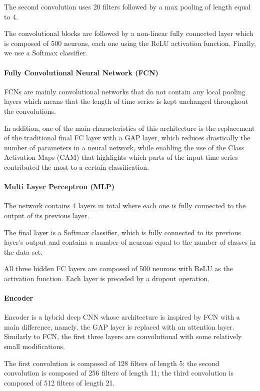 \documentclass[conference]{IEEEtran}
\begin{document}
The second convolution uses 20 filters followed by a max pooling of length equal to 4. 

The convolutional blocks are followed by a non-linear fully connected layer which is composed of 500 neurons, each one using the ReLU activation function. Finally, we use a Softmax classifier.

\paragraph{Fully Convolutional Neural Network (FCN)}
FCNs are mainly convolutional networks \cite{Wang2017} that do not contain any local pooling layers which means that the length of time series is kept unchanged throughout the convolutions. 

In addition, one of the main characteristics of this architecture is the replacement of the traditional final FC layer with a GAP layer, which reduces drastically the number of parameters in a neural network, while enabling the use of the Class Activation Maps (CAM) that highlights which parts of the input time series contributed the most to a certain classification.

\paragraph{Multi Layer Perceptron (MLP)}
The network \cite{Wang2017} contains 4 layers in total where each one is fully connected to the output of its previous layer.

The final layer is a Softmax classifier, which is fully connected to its previous layer’s output and contains a number of neurons equal to the number of classes in the data set. 

All three hidden FC layers are composed of 500 neurons with ReLU as the activation function. Each layer is preceded by a dropout operation.

\paragraph{Encoder}
Encoder \cite{Sera2018} is a hybrid deep CNN whose architecture is inspired by FCN with a main difference, namely, the GAP layer is replaced with an attention layer. Similarly to FCN, the first three layers are convolutional with some relatively small modifications. 

The first convolution is composed of 128 filters of length 5; the second convolution is composed of 256 filters of length 11; the third convolution is composed of 512 filters of length 21. 
\end{document}
